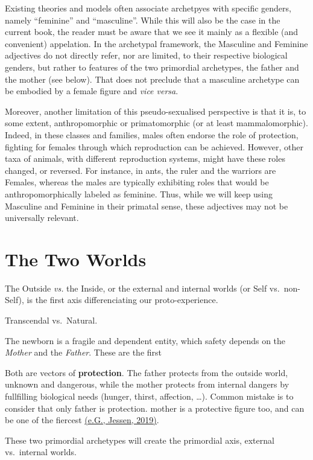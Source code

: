 \documentclass[]{book}
\begin{document}
Existing theories and models often associate archetpyes with specific genders, namely ``feminine'' and ``masculine''. While this will also be the case in the current book, the reader must be aware that we see it mainly as a flexible (and convenient) appelation. In the archetypal framework, the Masculine and Feminine adjectives do not directly refer, nor are limited, to their respective biological genders, but rather to features of the two primordial archetypes, the father and the mother (see below). That does not preclude that a masculine archetype can be embodied by a female figure and \emph{vice versa}.

Moreover, another limitation of this pseudo-sexualised perspective is that it is, to some extent, anthropomorphic or primatomorphic (or at least mammalomorphic). Indeed, in these classes and families, males often endorse the role of protection, fighting for females through which reproduction can be achieved. However, other taxa of animals, with different reproduction systems, might have these roles changed, or reversed. For instance, in ants, the ruler and the warriors are Females, whereas the males are typically exhibiting roles that would be anthropomorphically labeled as feminine. Thus, while we will keep using Masculine and Feminine in their primatal sense, these adjectives may not be universally relevant.

\hypertarget{the-two-worlds}{%
\section{The Two Worlds}\label{the-two-worlds}}

The Outside \emph{vs.} the Inside, or the external and internal worlds (or Self vs.~non-Self), is the first axis differenciating our proto-experience.

Transcendal vs.~Natural.

The newborn is a fragile and dependent entity, which safety depends on the \emph{Mother} and the \emph{Father}. These are the first

Both are vectors of \textbf{protection}. The father protects from the outside world, unknown and dangerous, while the mother protects from internal dangers by fullfilling biological needs (hunger, thirst, affection, \ldots). Common mistake is to consider that only father is protection. mother is a protective figure too, and can be one of the fiercest \href{https://doi.org/10.1101/827626}{(e.G., Jessen, 2019)}.

These two primordial archetypes will create the primordial axis, external vs.~internal worlds.
\end{document}
